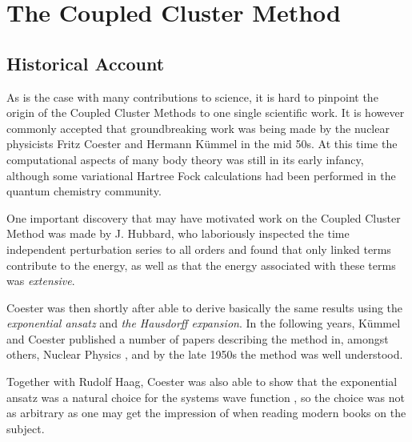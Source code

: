 
\chapter{The Coupled Cluster Method} %

\label{Chapter5} %



\section{Historical Account}


As is the case with many contributions to science, it is hard to pinpoint the origin of the Coupled Cluster Methods to one single scientific work. It is however commonly accepted that groundbreaking work was being made by the nuclear physicists Fritz Coester and Hermann Kümmel in the mid 50s. At this time the computational aspects of many body theory was still in its early infancy, although some variational Hartree Fock calculations had been performed in the quantum chemistry community. \cite{Kummel}

One important discovery that may have motivated work on the Coupled Cluster Method was made by J. Hubbard, who laboriously inspected the time independent perturbation series to all orders and found that only linked terms contribute to the energy, as well as that the energy associated with these terms was \emph{extensive}.  \cite{Hubbard} 

Coester was then shortly after able to derive basically the same results using the \emph{exponential ansatz} and \emph{the Hausdorff expansion}. \cite{Kummel} In the following years, Kümmel and Coester published a number of papers describing the method in, amongst others, Nuclear Physics \cite{Coester1958, Coester1960b}, and by the late 1950s the method was well understood. \cite{Kummel}

Together with Rudolf Haag, Coester was also able to show that the exponential ansatz was a natural choice for the systems wave function \cite{Coester1960a}, so the choice was not as arbitrary as one may get the impression of when reading modern books on the subject. \cite{ShavittBartlett2009}


